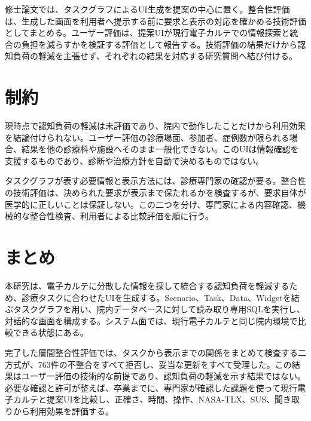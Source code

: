 \documentclass[a4paper]{jsarticle}
\begin{document}
修士論文では、タスクグラフによるUI生成を提案の中心に置く。整合性評価は、生成した画面を利用者へ提示する前に要求と表示の対応を確かめる技術評価としてまとめる。ユーザー評価は、提案UIが現行電子カルテでの情報探索と統合の負担を減らすかを検証する評価として報告する。技術評価の結果だけから認知負荷の軽減を主張せず、それぞれの結果を対応する研究質問へ結び付ける。

\section{制約}

現時点で認知負荷の軽減は未評価であり、院内で動作したことだけから利用効果を結論付けられない。ユーザー評価の診療場面、参加者、症例数が限られる場合、結果を他の診療科や施設へそのまま一般化できない。このUIは情報確認を支援するものであり、診断や治療方針を自動で決めるものではない。

タスクグラフが表す必要情報と表示方法には、診療専門家の確認が要る。整合性の技術評価は、決められた要求が表示まで保たれるかを検査するが、要求自体が医学的に正しいことは保証しない。この二つを分け、専門家による内容確認、機械的な整合性検査、利用者による比較評価を順に行う。

\section{まとめ}

本研究は、電子カルテに分散した情報を探して統合する認知負荷を軽減するため、診療タスクに合わせたUIを生成する。Scenario、Task、Data、Widgetを結ぶタスクグラフを用い、院内データベースに対して読み取り専用SQLを実行し、対話的な画面を構成する。システム面では、現行電子カルテと同じ院内環境で比較できる状態にある。

完了した層間整合性評価では、タスクから表示までの関係をまとめて検査する二方式が、763件の不整合をすべて拒否し、妥当な更新をすべて受理した。この結果はユーザー評価の技術的な前提であり、認知負荷の軽減を示す結果ではない。必要な確認と許可が整えば、卒業までに、専門家が確認した課題を使って現行電子カルテと提案UIを比較し、正確さ、時間、操作、NASA-TLX、SUS、聞き取りから利用効果を評価する。



\end{document}
